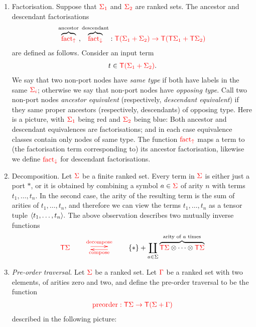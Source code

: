     \begin{enumerate}
        \setcounter{enumi}{\value{typeoperations}}
        \item Factorisation. Suppose that ${\color{red}{\Sigma_1}}$ and ${\color{red}{\Sigma_2}}$ are ranked sets. The ancestor and descendant factorisations 
        \begin{align*}
            \overbrace{{\color{red}{\mathrm{fact_{\uparrow}}}}}^{\text{ancestor}}, \overbrace{{\color{red}{\mathrm{fact_{\downarrow}}}}}^{\text{descendant}}  : {\color{red}{{\color{red}{\mathsf T}}(\Sigma_1+\Sigma_2) \to {\color{red}{\mathsf T}}({\color{red}{\mathsf T}}\Sigma_1 + {\color{red}{\mathsf T}}\Sigma_2)}}
        \end{align*}
        are defined as follows. Consider an input term
        \begin{align*}
            t \in {\color{red}{{\color{red}{\mathsf T}}(\Sigma_1+\Sigma_2)}}.
        \end{align*}
        We say that two non-port nodes have \emph{same type} if both have labels in the same  ${\color{red}{\Sigma_i}}$; otherwise we say that non-port nodes have \emph{opposing type}.  Call two non-port nodes \emph{ancestor equivalent} (respectively, \emph{descendant equivalent}) if they  same proper ancestors (respectively, descendants) of opposing type. Here is a picture, with ${\color{red}{\Sigma_1}}$ being red and ${\color{red}{\Sigma_2}}$ being blue:
        Both ancestor and descendant equivalences are factorisations; and in each case equivalence classes contain only nodes of same type.  The function ${\color{red}{\mathrm{fact_{\uparrow}}}}$ maps a term to (the factorisation term corresponding to) its ancestor factorisation, likewise we define ${\color{red}{\mathrm{fact_{\downarrow}}}}$ for  descendant factorisations.
        \item Decomposition. Let ${\color{red}{\Sigma}}$ be a finite ranked set. Every term in ${\color{red}{{\color{red}{\Sigma}}}}$ is either just a port $*$, or it is obtained by combining a symbol $a \in {\color{red}{\Sigma}}$ of arity $n$ with terms $t_1,\ldots,t_n$. In the second case, the arity of the resulting term is the sum of arities of $t_1,\ldots,t_n$, and therefore we can view the terms $t_1,\ldots,t_n$ as a tensor tuple $\langle{t_1,\ldots,t_n}\rangle.$  The above observation describes two mutually inverse functions 
        \begin{align*}
            \tmonad \rSigma  \qquad \ranked{\xymatrix{
                \ar@<.5ex>[r]^{\decomposeterm}&  \ar@<.5ex>[l]^{\composeterm} 
            }} \qquad 
            \set * + \coprod_{a \in \Sigma} \overbrace{\tmonad \rSigma \otimes \cdots \otimes \tmonad \rSigma}^{\text{arity of $a$ times}}
        \end{align*}
        \item \emph{Pre-order traversal.} Let  ${\color{red}{\Sigma}}$ be a ranked set. Let ${\color{red}{\Gamma}}$ be a ranked set with two elements, of arities zero and two, and  define the pre-order traversal to be the function
        \begin{align*}
            {\color{red}{{\color{red}{\mathrm{preorder}}}: {\color{red}{\mathsf T}}\Sigma \to {\color{red}{\mathsf T}}({\color{red}{\Sigma}}+ {\color{red}{\Gamma}})}}
        \end{align*}
        described in the following picture:
        \setcounter{typeoperations}{\value{enumi}}
    \end{enumerate}

